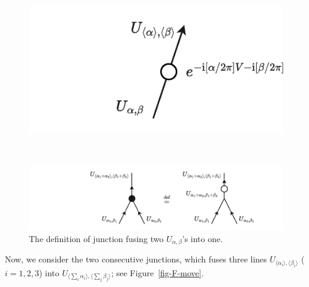 \documentclass[
  letterpaper,
  DIV=11,
  numbers=noendperiod]{scrreport}
\begin{document}
\begin{figure}[t]

\begin{minipage}{0.35\linewidth}
\begin{center}
\includegraphics{figures/prod_isom.pdf}
\end{center}
\end{minipage}%
%
\begin{minipage}{0.05\linewidth}
~\end{minipage}%
%
\begin{minipage}{0.60\linewidth}
\begin{center}
\includegraphics{figures/junction_def.pdf}
\end{center}
\end{minipage}%

\caption{\label{fig-junction-def}The definition of junction fusing two
\(U_{\alpha,\beta}\)'s into one.}

\end{figure}%

Now, we consider the two consecutive junctions, which fuses three lines
\(U_{\langle\alpha_i\rangle,\langle\beta_i\rangle}\) (\(i=1,2,3\)) into
\(U_{\langle\sum_i \alpha_i\rangle,\langle\sum_j \beta_j \rangle}\); see
Figure~\ref{fig-F-move}.
\end{document}
